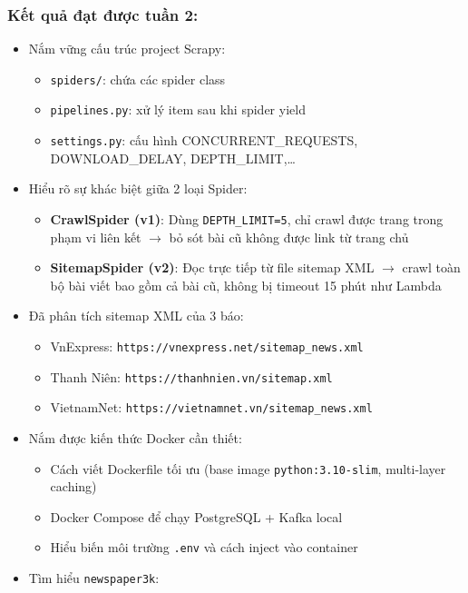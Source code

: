 \hypertarget{kux1ebft-quux1ea3-ux111ux1ea1t-ux111ux1b0ux1ee3c-tuux1ea7n-2}{%
\subsubsection{Kết quả đạt được tuần
2:}}

\begin{itemize}
\tightlist
\item
  Nắm vững cấu trúc project Scrapy:

  \begin{itemize}
  \tightlist
  \item
    \texttt{spiders/}: chứa các spider class
  \item
    \texttt{pipelines.py}: xử lý item sau khi spider yield
  \item
    \texttt{settings.py}: cấu hình CONCURRENT\_REQUESTS,
    DOWNLOAD\_DELAY, DEPTH\_LIMIT,\ldots{}
  \end{itemize}
\item
  Hiểu rõ sự khác biệt giữa 2 loại Spider:

  \begin{itemize}
  \tightlist
  \item
    \textbf{CrawlSpider (v1)}: Dùng \texttt{DEPTH\_LIMIT=5}, chỉ crawl
    được trang trong phạm vi liên kết \(\rightarrow\) bỏ sót bài cũ
    không được link từ trang chủ
  \item
    \textbf{SitemapSpider (v2)}: Đọc trực tiếp từ file sitemap XML
    \(\rightarrow\) crawl toàn bộ bài viết bao gồm cả bài cũ, không bị
    timeout 15 phút như Lambda
  \end{itemize}
\item
  Đã phân tích sitemap XML của 3 báo:

  \begin{itemize}
  \tightlist
  \item
    VnExpress: \texttt{https://vnexpress.net/sitemap\_news.xml}
  \item
    Thanh Niên: \texttt{https://thanhnien.vn/sitemap.xml}
  \item
    VietnamNet: \texttt{https://vietnamnet.vn/sitemap\_news.xml}
  \end{itemize}
\item
  Nắm được kiến thức Docker cần thiết:

  \begin{itemize}
  \tightlist
  \item
    Cách viết Dockerfile tối ưu (base image \texttt{python:3.10-slim},
    multi-layer caching)
  \item
    Docker Compose để chạy PostgreSQL + Kafka local
  \item
    Hiểu biến môi trường \texttt{.env} và cách inject vào container
  \end{itemize}
\item
  Tìm hiểu \texttt{newspaper3k}:


\end{itemize}
